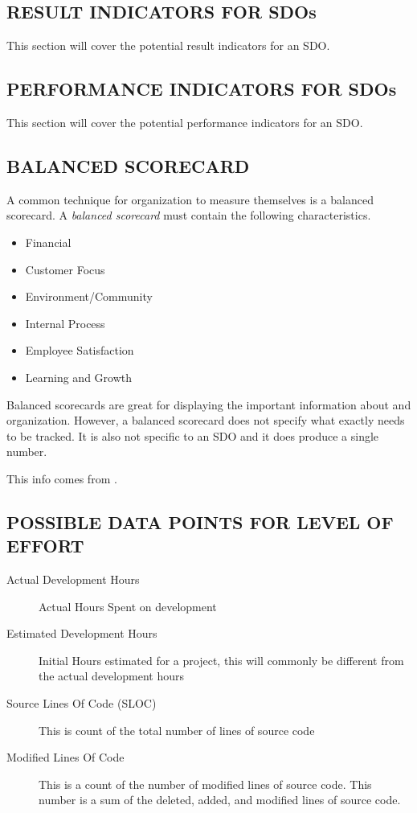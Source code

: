 \documentclass[SDSUThesis.tex]{subfiles}
\begin{document}
\subsection{RESULT INDICATORS FOR SDOs}
    This section will cover the potential result indicators for an SDO.

\subsection{PERFORMANCE INDICATORS FOR SDOs}
    This section will cover the potential performance indicators for an SDO.
    

\subsection{BALANCED SCORECARD}

A common technique for organization to measure themselves is a balanced scorecard.
A \textit{balanced scorecard} must contain the following
characteristics.
\begin{itemize}
  \item Financial 
  \item Customer Focus
  \item Environment/Community
  \item Internal Process
  \item Employee Satisfaction
  \item Learning and Growth
\end{itemize}

Balanced scorecards are great for displaying the important information about
and organization.  However, a balanced scorecard does not specify what
exactly needs to be tracked.  It is also not specific to an SDO and 
it does produce a single number.

This info comes from \cite{parmenter2010}.

\subsection{POSSIBLE DATA POINTS FOR LEVEL OF EFFORT}

\begin{description}
    \item[Actual Development Hours] Actual Hours Spent on development
    \item[Estimated Development Hours]  Initial Hours estimated for a project, this will commonly be different from the actual development hours
    \item[Source Lines Of Code (SLOC)]  This is count of the total number of lines of source code
    \item[Modified Lines Of Code] This is a count of the number of modified lines of source code. This number is a sum of the deleted, added, and modified lines of source code.
\end{description}
\end{document}
